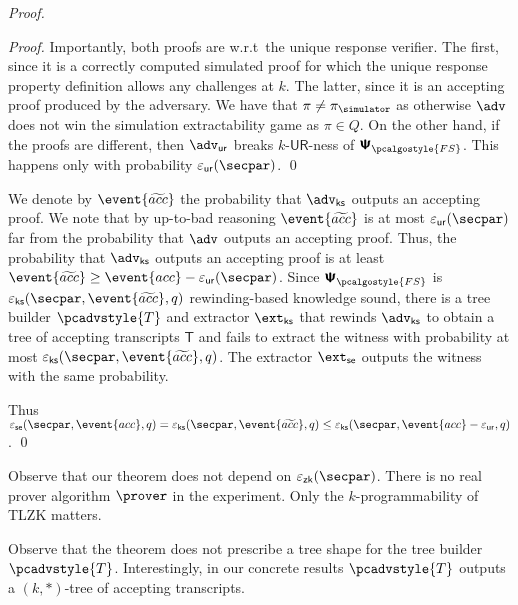 \documentclass[10pt]{llncs}
\newcommand{\zkproofs}{\zkproof_\simulator}
\newcommand{\pcvarstyle}[1]{\mathsf{#1}}
\newcommand{\eps}{\varepsilon}
\newcommand{\zkproof}{\pi}
\newcommand{\proofsystem}{\pcschemestyle{\Psi}}
\newcommand{\psfs}{\proofsystem_\fs}
\newcommand{\fs}{\pcalgostyle{FS}}
\newcommand{\se}{\pcvarstyle{se}}
\newcommand{\tree}{\pcvarstyle{T}}
\newcommand{\pcschemestyle}[1]{\bm{\mathsf{#1}}}
\newcommand{\tdv}{\pcadvstyle{T}}
\newcommand{\accProb}{\event{acc}}
\newcommand{\waccProb}{\event{\widetilde{acc}}}
\newcommand{\ur}[1]{{#1\text{-}\mathsf{UR}}}
\newcommand{\extse}{\ext_\se}
\newcommand{\extcss}{\ext_{\css}}
\newcommand{\css}{\pcvarstyle{ks}}
\newcommand{\advse}{\adv}
\newcommand{\advur}{\adv_{\pcvarstyle{ur}}}
\newcommand{\advcss}{\adv_{\pcvarstyle{ks}}}
\newcommand{\epsur}{\eps_\pcvarstyle{ur}}
\newcommand{\epszk}{\eps_{\pcvarstyle{zk}}}
\newcommand{\epscss}{\eps_{\pcvarstyle{ks}}}
\newcommand{\epsse}{\eps_{\pcvarstyle{se}}}
\DeclareRobustCommand{\markulf}[2] {}%
\newcommand{\hamid}[2] {} %
\begin{document}
\begin{proof}
\begin{proof}
		Importantly, both proofs are  w.r.t~the unique response verifier. The first, since it is a correctly computed simulated proof for which the unique response property definition allows any challenges at $k$. The latter, since it is an accepting proof produced by the adversary.
		We have that $\zkproof \neq \zkproofs$ as otherwise $\advse$ does not win the simulation extractability game as $\zkproof \in Q$. On the other hand, if the proofs are different, then $\advur$ breaks $\ur{k}$-ness of $\psfs$. This happens only with  probability $\epsur(\secpar)$. 
		\qed
	\end{proof}
	
	We denote by $\waccProb$ the probability that $\advcss$ outputs an accepting proof. We note that by up-to-bad reasoning $\waccProb$ is at most $\epsur (\secpar)$ far from the probability that $\advse$ outputs an  accepting proof. Thus, the probability that $\advcss$ outputs an accepting proof is at least $\waccProb \geq \accProb - \epsur (\secpar)$. %
	Since $\psfs$ is $\epscss (\secpar, \waccProb,q)$ rewinding-based knowledge sound, there is a tree builder $\tdv$ and extractor $\extcss$ that rewinds $\advcss$ to obtain a tree of accepting transcripts $\tree$ and fails to extract the witness with probability at most $\epscss (\secpar, \waccProb, q)$. The extractor $\extse$ outputs the witness with the same probability.
	
	Thus $\epsse(\secpar,\accProb,q) = \epscss (\secpar, \waccProb,q) \leq \epscss(\secpar,\accProb - \epsur,q)$.
	\qed
\end{proof}

\begin{remark}
	Observe that our theorem does not depend on $\epszk(\secpar)$. There is no real prover algorithm $\prover$ in the experiment. Only the $k$-programmability of TLZK matters. 
\end{remark}

\begin{remark}
	Observe that the theorem does not prescribe a tree shape for the tree builder $\tdv$. Interestingly, in our concrete results $\tdv$ outputs a $(k, *)$-tree of accepting transcripts.
\end{remark}
\end{document}
